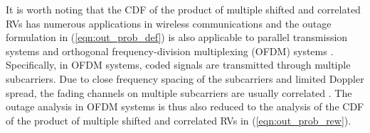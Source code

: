 \documentclass[12pt,onecolumn,draftcls]{IEEEtran}
\begin{document}
It is worth noting that the CDF of the product of multiple shifted and correlated RVs has numerous applications in wireless communications and the outage formulation in (\ref{eqn:out_prob_def}) is also applicable to parallel transmission systems and orthogonal frequency-division multiplexing (OFDM) systems \cite{bai2013outage,luo2005service}. Specifically, in OFDM systems, coded signals are transmitted through multiple subcarriers. Due to close frequency spacing of the subcarriers and limited Doppler spread, the fading channels on multiple subcarriers are usually correlated \cite{lu2002ldpc}. The outage analysis in OFDM systems is thus also reduced to the analysis of the CDF of the product of multiple shifted and correlated RVs in (\ref{eqn:out_prob_rew}).



\end{document}
